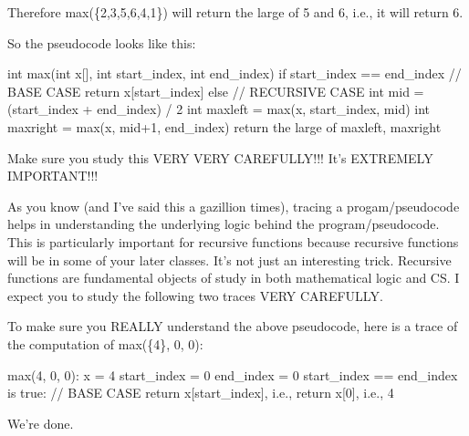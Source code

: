 Therefore max(\{2,3,5,6,4,1\}) will return the large of 5 and 6, i.e.,
it will return 6.

So the pseudocode looks like this:

\begin{consolethree}[escapeinside=||]
int max(int x[], int start_index, int end_index)
{
    if start_index == end_index
    {
        // BASE CASE
        return x[start_index]
    }
    else
    {
        // RECURSIVE CASE
        int mid = (start_index + end_index) / 2
        int maxleft = max(x, start_index, mid)
        int maxright = max(x, mid+1, end_index)
        return the large of maxleft, maxright
    }
}
\end{consolethree}

Make sure you study this VERY VERY CAREFULLY!!! It's
EXTREMELY IMPORTANT!!!

As you know (and I've said this a gazillion times),
tracing a progam/pseudocode helps in understanding the underlying logic
behind the program/pseudocode. This is particularly important for
recursive functions because recursive functions will be in some of your
later classes. It's not just an interesting trick.
Recursive functions are fundamental objects of study in both
mathematical logic and CS. I expect you to study the following two
traces VERY CAREFULLY.

To make sure you REALLY understand the above pseudocode, here is a trace
of the computation of max(\{4\}, 0, 0):

\begin{consolethree}
max({4}, 0, 0):
    x = {4}
    start_index = 0
    end_index = 0
    start_index == end_index is true:
        // BASE CASE
        return x[start_index], i.e., return x[0], i.e., 4
\end{consolethree}

We're done.

